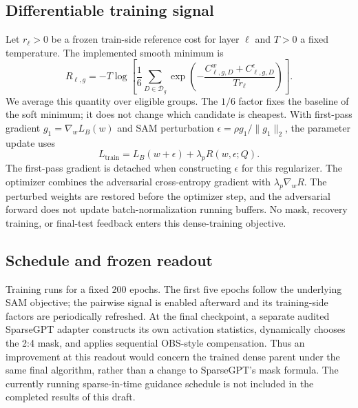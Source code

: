 \documentclass[10pt,a4paper]{article}
\begin{document}
\subsection{Differentiable training signal}
Let $r_\ell>0$ be a frozen train-side reference cost for layer $\ell$ and $T>0$ a fixed temperature. The implemented smooth minimum is
\begin{equation}
R_{\ell,g}=-T\log\left[\frac{1}{6}\sum_{D\in\mathcal D_g}
\exp\left(-\frac{C^{w}_{\ell,g,D}+C^{\epsilon}_{\ell,g,D}}{Tr_\ell}\right)\right].
\label{eq:softmin}
\end{equation}
We average this quantity over eligible groups. The $1/6$ factor fixes the baseline of the soft minimum; it does not change which candidate is cheapest. With first-pass gradient $g_1=\nabla_wL_B(w)$ and SAM perturbation $\epsilon=\rho g_1/\|g_1\|_2$, the parameter update uses
\begin{equation}
L_{\mathrm{train}}=L_B(w+\epsilon)+\lambda_p R(w,\epsilon;Q).
\label{eq:loss}
\end{equation}
The first-pass gradient is detached when constructing $\epsilon$ for this regularizer. The optimizer combines the adversarial cross-entropy gradient with $\lambda_p\nabla_wR$. The perturbed weights are restored before the optimizer step, and the adversarial forward does not update batch-normalization running buffers. No mask, recovery training, or final-test feedback enters this dense-training objective.

\subsection{Schedule and frozen readout}
Training runs for a fixed 200 epochs. The first five epochs follow the underlying SAM objective; the pairwise signal is enabled afterward and its training-side factors are periodically refreshed. At the final checkpoint, a separate audited SparseGPT adapter constructs its own activation statistics, dynamically chooses the 2:4 mask, and applies sequential OBS-style compensation. Thus an improvement at this readout would concern the trained dense parent under the same final algorithm, rather than a change to SparseGPT's mask formula. The currently running sparse-in-time guidance schedule is not included in the completed results of this draft.
\end{document}
